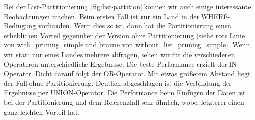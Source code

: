 Bei der List-Partitionierung~\ref{fig:list-partition} können wir auch einige interessante Beobachtungen machen.
Beim ersten Fall ist nur ein Land in der WHERE-Bedingung vorhanden.
Wenn dies so ist, dann hat die Partitionierung einen erheblichen Vorteil gegenüber der Version ohne Partitionierung (siehe rote Linie von with\_pruning\_simple und braune von without\_list\_pruning\_simple).
Wenn wir statt nur eines Landes mehrere abfragen, sehen wir für die verschiedenen Operatoren unterschiedliche Ergebnisse.
Die beste Performance erzielt der IN-Operator.
Dicht darauf folgt der OR-Operator.
Mit etwas größerem Abstand liegt der Fall ohne Partitionierung.
Deutlich abgeschlagen ist die Verbindung der Ergebnisse per UNION-Operator.
Die Performance beim Einfügen der Daten ist bei der Partitionierung und dem Referenzfall sehr ähnlich, wobei letzterer einen ganz leichten Vorteil hat.

